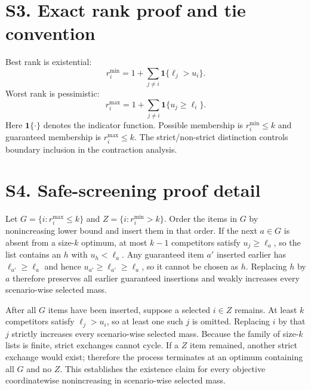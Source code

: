 \documentclass[10pt]{article}
\newcommand{\ind}{\mathbf{1}}
\begin{document}
\section*{S3. Exact rank proof and tie convention}
Best rank is existential:
\[r_i^{\min}=1+\sum_{j\ne i}\ind\{\ell_j>u_i\}.\]
Worst rank is pessimistic:
\[r_i^{\max}=1+\sum_{j\ne i}\ind\{u_j\ge\ell_i\}.\]
Here $\ind\{\cdot\}$ denotes the indicator function. Possible membership is $r_i^{\min}\le k$ and guaranteed membership is $r_i^{\max}\le k$. The strict/non-strict distinction controls boundary inclusion in the contraction analysis.

\section*{S4. Safe-screening proof detail}
Let $G=\{i:r_i^{\max}\le k\}$ and $Z=\{i:r_i^{\min}>k\}$. Order the items in $G$ by nonincreasing lower bound and insert them in that order. If the next $a\in G$ is absent from a size-$k$ optimum, at most $k-1$ competitors satisfy $u_j\ge\ell_a$, so the list contains an $h$ with $u_h<\ell_a$. Any guaranteed item $a'$ inserted earlier has $\ell_{a'}\ge\ell_a$ and hence $u_{a'}\ge\ell_{a'}\ge\ell_a$, so it cannot be chosen as $h$. Replacing $h$ by $a$ therefore preserves all earlier guaranteed insertions and weakly increases every scenario-wise selected mass.

After all $G$ items have been inserted, suppose a selected $i\in Z$ remains. At least $k$ competitors satisfy $\ell_j>u_i$, so at least one such $j$ is omitted. Replacing $i$ by that $j$ strictly increases every scenario-wise selected mass. Because the family of size-$k$ lists is finite, strict exchanges cannot cycle. If a $Z$ item remained, another strict exchange would exist; therefore the process terminates at an optimum containing all $G$ and no $Z$. This establishes the existence claim for every objective coordinatewise nonincreasing in scenario-wise selected mass.
\end{document}
